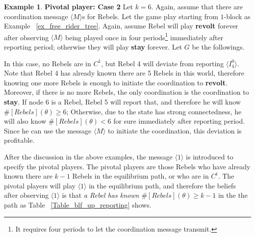 \documentclass[12pt,letter]{article}
\theoremstyle{definition}
\newtheorem{example}{Example}[section]
\theoremstyle{remark}
\theoremstyle{claim}
\begin{document}
\begin{example} \label{ex_pivotal_2}\textbf{Pivotal player: Case 2}
Let $k=6$. Again, assume that there are coordination message $\langle M\rangle$s for Rebels. Let the game play starting from $1$-block as Example ~\ref{ex_free_rider_tree}. Again, assume Rebel will play \textbf{revolt} forever after observing $\langle M \rangle$ being played once in four periods\footnote{It requires four periods to let the coordination message transmit.} immediately after reporting period; otherwise they will play \textbf{stay} forever. Let $G$ be the followings.

\begin{center}
\end{center}

In this case, no Rebels are in $C^1$, but Rebel 4 will deviate from reporting $\langle I^0_4 \rangle$. Note that Rebel 4 has already known there are 5 Rebels in this world, therefore knowing one more Rebels is enough to initiate the coordination to \textbf{revolt}. Moreover, if there is no more Rebels, the only coordination is the coordination to \textbf{stay}. If node 6 is a Rebel, Rebel 5 will report that, and therefore he will know $\#[Rebels](\theta)\geq 6$; Otherwise, due to the state has strong connectedness, he will also know $\#[Rebels](\theta)< 6$ for sure immediately after reporting period. Since he can use the message $\langle M \rangle$ to initiate the coordination, this deviation is profitable.
\end{example}

After the discussion in the above examples, the message $\langle 1 \rangle$ is introduced to specify the pivotal players. The pivotal players are those Rebels who have already known there are $k-1$ Rebels in the equilibrium path, or who are in $C^t$. The pivotal players will play $\langle 1 \rangle$ in the equilibrium path, and therefore the beliefs after observing $\langle 1 \rangle$ is that \textit{a Rebel has known $\#[Rebels](\theta)\geq k-1$} in the the path as Table ~\ref{Table_blf_up_reporting} shows.
\end{document}
